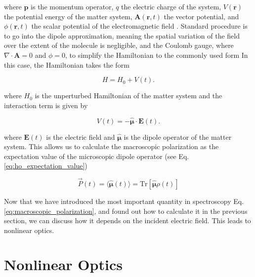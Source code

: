 \noindent
where $\mathbf{p}$ is the momentum operator, $q$ the electric charge of the system, $V(\mathbf{r})$ the potential energy of the matter system, $\mathbf{A}(\mathbf{r}, t)$ the vector potential, and $\phi(\mathbf{r}, t)$ the scalar potential of the electromagnetic field \cite{cohen-tannoudjietal2008atomphotoninteractionsbasic}. Standard procedure is to go into the dipole approximation, meaning the spatial variation of the field over the extent of the molecule is negligible, and the Coulomb gauge, where $\nabla \cdot \mathbf{A} = 0$ and $\phi = 0$, to simplify the Hamiltonian to the commonly used form 
In this case, the Hamiltonian takes the form

\begin{equation}
	H = H_0 + V(t).
\end{equation}

\noindent 
where $H_0$ is the unperturbed Hamiltonian of the matter system and the interaction term is given by

\begin{equation} \label{eq:dipole_approx_term}
	V(t) = - \mathbf{\hat{\mu}} \cdot \mathbf{E}(t).
\end{equation}

\noindent
where $\mathbf{E}(t)$ is the electric field and $\mathbf{\hat{\mu}}$ is the dipole operator of the matter system. 
This allows us to calculate the macroscopic polarization as the expectation value of the microscopic dipole operator (see Eq. \eqref{eq:ho_expectation_value})

\begin{equation}
	\vec{P}(t) = \langle \mathbf{\hat{\mu}}(t) \rangle = \mathrm{Tr}[\mathbf{\hat{\mu}} \rho(t)]
	\label{eq:polarization_expectation_value}
\end{equation}


\noindent
Now that we have introduced the most important quantity in spectroscopy Eq. \ref{eq:macroscopic_polarization}, and found out how to calculate it in the previous section, we can discuss how it depends on the incident electric field. This leads to nonlinear optics.

\section{Nonlinear Optics}
\label{sec:nonlinear_optics}


